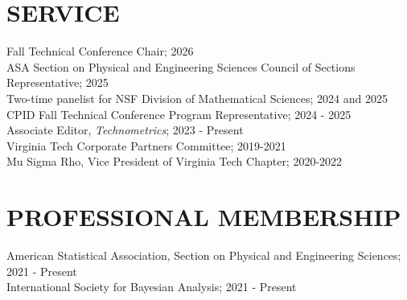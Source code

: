 \documentclass[margin,line,11pt]{res}
\begin{document}
\begin{resume}

\medskip
\section{\bf SERVICE}

Fall Technical Conference Chair; 2026 \\
ASA Section on Physical and Engineering Sciences Council of Sections Representative; 2025 \\
Two-time panelist for NSF Division of Mathematical Sciences; 2024 and 2025 \\
CPID Fall Technical Conference Program Representative; 2024 - 2025 \\
Associate Editor, {\it Technometrics}; 2023 - Present \\
Virginia Tech Corporate Partners Committee; 2019-2021 \\
Mu Sigma Rho, Vice President of Virginia Tech Chapter; 2020-2022

\medskip
\section{\bf PROFESSIONAL MEMBERSHIP}

American Statistical Association, Section on Physical and Engineering Sciences; 2021 - Present \\
International Society for Bayesian Analysis; 2021 - Present \\

\end{resume}
\end{document}
